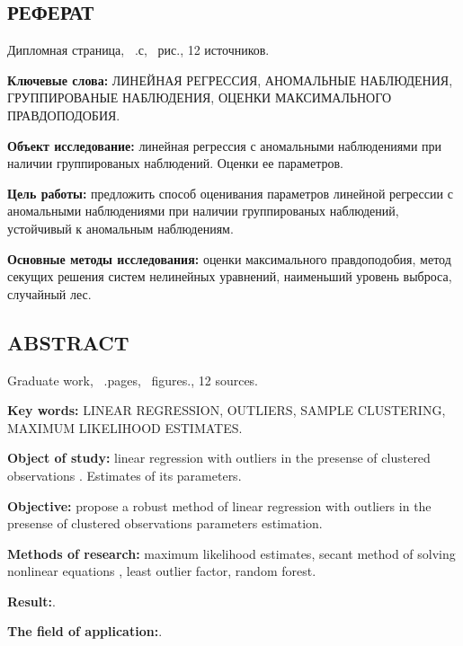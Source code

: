 \begin{center}
    \section*{РЕФЕРАТ}
\end{center}
{}

Дипломная страница, ~.с, ~рис., 12 источников.

\textbf{Ключевые слова:} ЛИНЕЙНАЯ РЕГРЕССИЯ, АНОМАЛЬНЫЕ НАБЛЮДЕНИЯ, ГРУППИРОВАНЫЕ НАБЛЮДЕНИЯ, ОЦЕНКИ МАКСИМАЛЬНОГО ПРАВДОПОДОБИЯ.

\textbf{Объект исследование:} линейная регрессия с аномальными наблюдениями при наличии группированых наблюдений. Оценки ее параметров.

\textbf{Цель работы:} предложить способ оценивания параметров линейной регрессии с аномальными наблюдениями при наличии группированых наблюдений, устойчивый к аномальным наблюдениям.

\textbf{Основные методы исследования:} оценки максимального правдоподобия, метод секущих решения систем нелинейных уравнений, наименьший уровень выброса, случайный лес.



\newpage

\begin{center}
    \section*{ABSTRACT}
\end{center}
{}

Graduate work, ~.pages, ~figures., 12 sources.

\textbf{Key words:} LINEAR REGRESSION, OUTLIERS, SAMPLE CLUSTERING, MAXIMUM LIKELIHOOD ESTIMATES.

\textbf{Object of study:} linear regression with outliers in the presense of clustered observations . Estimates of its parameters.

\textbf{Objective:} propose a robust method of linear regression with outliers in the presense of clustered observations parameters estimation.

\textbf{Methods of research:} maximum likelihood estimates, secant method of solving nonlinear equations , least outlier factor, random forest.

\textbf{Result:}.

\textbf{The field of application:}.